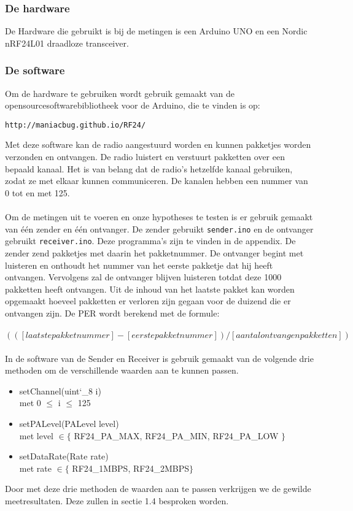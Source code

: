 \documentclass{article}
\begin{document}
\subsubsection{De hardware}
De Hardware die gebruikt is bij de metingen is een Arduino UNO en een Nordic nRF24L01 draadloze transceiver.\\

\subsubsection{De software}
Om de hardware te gebruiken wordt gebruik gemaakt van de opensourcesoftwarebibliotheek voor de Arduino, die te vinden is op: \begin{verbatim}http://maniacbug.github.io/RF24/ \end{verbatim} 
Met deze software kan de radio aangestuurd worden en kunnen pakketjes worden verzonden en ontvangen. De radio luistert en verstuurt pakketten over een bepaald kanaal. Het is van belang dat de radio's hetzelfde kanaal gebruiken, zodat ze met elkaar kunnen communiceren. De kanalen hebben een nummer van 0 tot en met 125.\\
\\
Om de metingen uit te voeren en onze hypotheses te testen is er gebruik gemaakt van \'{e}\'{e}n zender en \'{e}\'{e}n ontvanger. De zender gebruikt \texttt{sender.ino} en de ontvanger gebruikt \texttt{receiver.ino}. Deze programma's zijn te vinden in de appendix. De zender zend pakketjes met daarin het pakketnummer. De ontvanger begint met luisteren en onthoudt het nummer van het eerste pakketje dat hij heeft ontvangen. Vervolgens zal de ontvanger blijven luisteren totdat deze 1000 pakketten heeft ontvangen. Uit de inhoud van het laatste pakket kan worden opgemaakt hoeveel pakketten er verloren zijn gegaan voor de duizend die er ontvangen zijn. De PER wordt berekend met de formule:\\
\\
\indent	$(([laatste pakketnummer]-[eerste pakketnummer])/[aantal ontvangen pakketten])$\\
\\
In de software van de Sender en Receiver is gebruik gemaakt van de volgende drie methoden om de verschillende waarden aan te kunnen passen. 
\begin{itemize}
	\item setChannel(uint\char`_8 i) \\
	met 0 $\leq$ i $\leq$ 125
	\item setPALevel(PALevel level) \\
	met level $\in \{$  RF24\_PA\_MAX, RF24\_PA\_MIN, RF24\_PA\_LOW $\}$
	\item setDataRate(Rate rate) \\
	met rate $\in \{$ RF24\_1MBPS, RF24\_2MBPS$\}$
\end{itemize}
Door met deze drie methoden de waarden aan te passen verkrijgen we de gewilde meetresultaten. Deze zullen in sectie 1.4 besproken worden.
\end{document}

